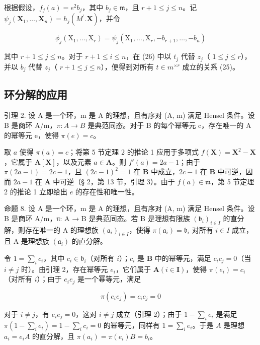 根据假设，\(f_{j}(a) = e^{2}b_{j}\)，其中 \(b_{j} \in \mathfrak{m}\)，且 \(r + 1 \leqslant j \leqslant n\)。记 \(\psi_{j}(\mathbf{X}_{1},\ldots ,\mathbf{X}_{n}) = h_{j}(M^{\prime}.\mathbf{X})\)，并令

\[
\phi_ {j} \left(\mathrm{X} _ {1}, \dots , \mathrm{X} _ {r}\right) = \psi_ {j} \left(\mathrm{X} _ {1}, \dots , \mathrm{X} _ {r}, - b _ {r + 1}, \dots , - b _ {n}\right)
\]

其中 \(r + 1 \leqslant j \leqslant n\)。对于 \(r + 1 \leqslant i \leqslant n\)，在 (26) 中以 \(t_j\) 代替 \(z_j\)（ \(1 \leqslant j \leqslant r\)），并以 \(b_j\) 代替 \(z_j\)（ \(r + 1 \leqslant j \leqslant n\)），便得到对所有 \(t \in m^{\times r}\) 成立的关系 (25)。

\subsection{环分解的应用}

引理 2. 设 A 是一个环，m 是 A 的理想，且有序对 (A, m) 满足 Hensel 条件。设 B 是商环 A/m，\(\pi: A \to B\) 是典范同态。对于 B 的每个幂等元 c，存在唯一的 A 的幂等元 e，使得 \(\pi(e) = c\)。

取 \(a\) 使得 \(\pi(a) = c\)；将第 5 节定理 2 的推论 1 应用于多项式 \(f(\mathbf{X}) = \mathbf{X}^2 - \mathbf{X}\)，它属于 \(\mathbf{A}[\mathbf{X}]\)，以及元素 \(a \in \mathbf{A}\)。则 \(f'(a) = 2a - 1\)；由于 \(\pi(2a - 1) = 2c - 1\)，且 \((2c - 1)^2 = 1\) 在 \(\mathbf{B}\) 中成立，\(2c - 1\) 在 \(\mathbf{B}\) 中可逆，因而 \(2a - 1\) 在 \(\mathbf{A}\) 中可逆（§ 2，第 13 节，引理 3）。由于 \(f(a) \in \mathfrak{m}\)，第 5 节定理 2 的推论 1 立即给出 \(e\) 的存在性和唯一性。

命题 8. 设 A 是一个环，m 是 A 的理想，且有序对 (A, m) 满足 Hensel 条件。设 B 是商环 A/m，π: A → B 是典范同态。若 B 是理想有限族 \((\mathfrak{b}_{i})_{i\in I}\) 的直分解，则存在唯一的 A 的理想族 \((\mathfrak{a}_{i})_{i\in I}\)，使得 \(\pi(\mathfrak{a}_{i}) = \mathfrak{b}_{i}\) 对所有 \(i \in I\) 成立，且 A 是理想族 \((\mathfrak{a}_{i})\) 的直分解。

令 \(1 = \sum_{i} c_{i}\)，其中 \(c_{i} \in \mathfrak{b}_{i}\)（对所有 \(i\)）；\(c_{i}\) 是 \(\mathbf{B}\) 中的幂等元，满足 \(c_{i}c_{j} = 0\)（当 \(i \neq j\) 时）。由引理 2，存在幂等元 \(e_{i}\)，它们属于 \(\mathbf{A} (i \in \mathbf{I})\)，使得 \(\pi(e_{i}) = c_{i}\)（对所有 \(i\)）；由于 \(e_{i}e_{j}\) 是一个幂等元，满足

\[
\pi (e _ {i} e _ {j}) = c _ {i} c _ {j} = 0
\]

对于 \(i \neq j\)，有 \(e_i e_j = 0\)，这对 \(i \neq j\) 成立（引理 2）；由于 \(1 - \sum_{i} e_i\) 是满足 \(\pi\left(1 - \sum_{i} e_i\right) = 1 - \sum_{i} c_i = 0\) 的幂等元，同样有 \(1 = \sum_{i} e_i\)。于是 \(A\) 是理想 \(a_i = e_i A\) 的直分解，且 \(\pi(a_i) = \pi(e_i) B = b_i\)。

